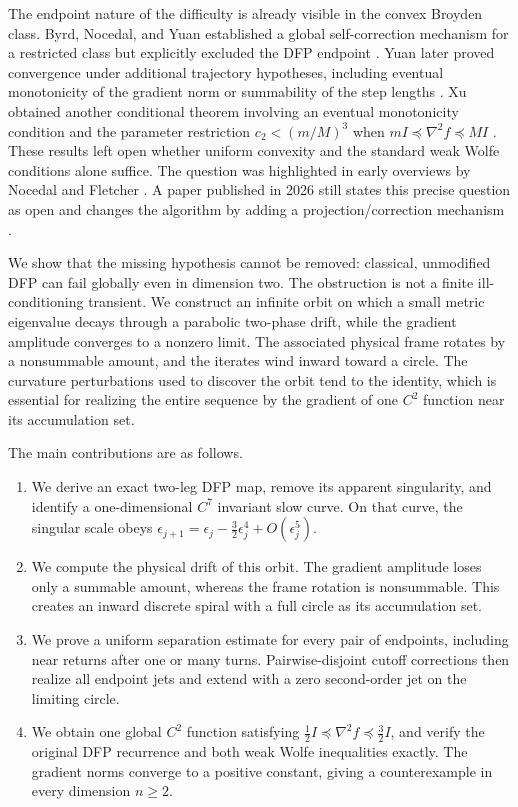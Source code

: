 \documentclass[smallextended,envcountsame]{svjour3}
\begin{document}
The endpoint nature of the difficulty is already visible in the convex
Broyden class.  Byrd, Nocedal, and Yuan established a global self-correction
mechanism for a restricted class but explicitly excluded the DFP endpoint
\cite{ByrdNocedalYuan1987}.  Yuan later proved convergence under additional
trajectory hypotheses, including eventual monotonicity of the gradient norm
or summability of the step lengths \cite{Yuan1995}.  Xu obtained another
conditional theorem involving an eventual monotonicity condition and the
parameter restriction $c_2<(m/M)^3$ when
$mI\preceq\nabla^2f\preceq MI$ \cite{Xu1997}.  These results left open whether
uniform convexity and the standard weak Wolfe conditions alone suffice.  The
question was highlighted in early overviews by Nocedal and Fletcher
\cite{Nocedal1992,Fletcher1994}.  A paper published in 2026 still states this
precise question as open and changes the algorithm by adding a
projection/correction mechanism
\cite{YuanZhouPham2026}.

We show that the missing hypothesis cannot be removed: classical,
unmodified DFP can fail globally even in dimension two.  The obstruction is
not a finite ill-conditioning transient.  We construct an infinite orbit on
which a small metric eigenvalue decays through a parabolic two-phase drift,
while the gradient amplitude converges to a nonzero limit.  The associated
physical frame rotates by a nonsummable amount, and the iterates wind inward
toward a circle.  The curvature perturbations used to discover the orbit tend
to the identity, which is essential for realizing the entire sequence by the
gradient of one $C^2$ function near its accumulation set.

The main contributions are as follows.
\begin{enumerate}
\item We derive an exact two-leg DFP map, remove its apparent singularity, and
      identify a one-dimensional $C^7$ invariant slow curve.  On that curve,
      the singular scale obeys
      $\epsilon_{j+1}=\epsilon_j-\frac32\epsilon_j^4+O(\epsilon_j^5)$.
\item We compute the physical drift of this orbit.  The gradient amplitude
      loses only a summable amount, whereas the frame rotation is
      nonsummable.  This creates an inward discrete spiral with a full circle
      as its accumulation set.
\item We prove a uniform separation estimate for every pair of endpoints,
      including near returns after one or many turns.  Pairwise-disjoint
      cutoff corrections then realize all endpoint jets and extend with a
      zero second-order jet on the limiting circle.
\item We obtain one global $C^2$ function satisfying
      $\frac12I\preceq\nabla^2f\preceq\frac32I$, and verify the original DFP
      recurrence and both weak Wolfe inequalities exactly.  The gradient
      norms converge to a positive constant, giving a counterexample in every
      dimension $n\ge2$.
\end{enumerate}
\end{document}
